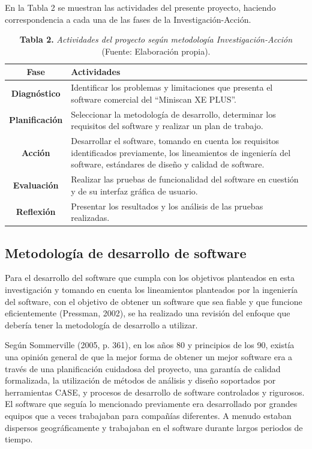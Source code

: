 \documentclass[12pt, a4paper]{article}
\begin{document}
En la Tabla 2 se muestran las actividades del presente proyecto, haciendo correspondencia a cada una de las fases de la Investigaci\'{o}n-Acci\'{o}n.
\FloatBarrier %
\begin{table}[htb]
	\small
	\centering
	\setlength{\extrarowheight}{5pt}
	\begin{tabulary}{15cm}{|c|L|}
		\hline
		\textbf{Fase} & \textbf{Actividades}\\ \hline
		\textbf{Diagn\'{o}stico} & Identificar los problemas y limitaciones que presenta el software comercial del ``Miniscan XE PLUS''.\\ \hline
		\textbf{Planificaci\'{o}n} & Seleccionar la metodolog\'{i}a de desarrollo, determinar los requisitos del software y realizar un plan de trabajo.
\\ \hline
		\textbf{Acci\'{o}n} & Desarrollar el software, tomando en cuenta los requisitos identificados previamente, los lineamientos de ingenier\'{i}a del software, est\'{a}ndares de dise\~{n}o y calidad de software.\\ \hline
		\textbf{Evaluaci\'{o}n} & Realizar las pruebas de funcionalidad del software en cuesti\'{o}n y de su interfaz gr\'{a}fica de usuario.\\ \hline
		\textbf{Reflexi\'{o}n} & Presentar los resultados y los an\'{a}lisis de las pruebas realizadas.\\ \hline
	\end{tabulary}
	\caption{\textbf{Tabla 2.} \textit{Actividades del proyecto seg\'{u}n metodolog\'{i}a Investigaci\'{o}n-Acci\'{o}n }		(Fuente: Elaboración propia).}
\end{table}
\FloatBarrier %
	\subsection{Metodolog\'{i}a de desarrollo de software}
Para el desarrollo del software que cumpla con los objetivos planteados en esta investigaci\'{o}n y tomando en cuenta los lineamientos planteados por la ingenier\'{i}a del software, con el objetivo de obtener un software que sea fiable y que funcione eficientemente (Pressman, 2002), se ha realizado una revisi\'{o}n del enfoque que deber\'{i}a tener la metodolog\'{i}a de desarrollo a utilizar.

Seg\'{u}n Sommerville (2005, p. 361), en los a\~{n}os 80 y principios de los 90, exist\'{i}a una opini\'{o}n general de que la mejor forma de obtener un mejor software era a trav\'{e}s de una planificaci\'{o}n cuidadosa del proyecto, una garant\'{i}a de calidad formalizada, la utilizaci\'{o}n de m\'{e}todos de an\'{a}lisis y dise\~{n}o soportados por herramientas CASE, y procesos de desarrollo de software controlados y rigurosos. El software que segu\'{i}a lo mencionado previamente era desarrollado por grandes equipos que a veces trabajaban para compa\~{n}\'{i}as diferentes. A menudo estaban dispersos geogr\'{a}ficamente y trabajaban en el software durante largos periodos de tiempo.
\end{document}

